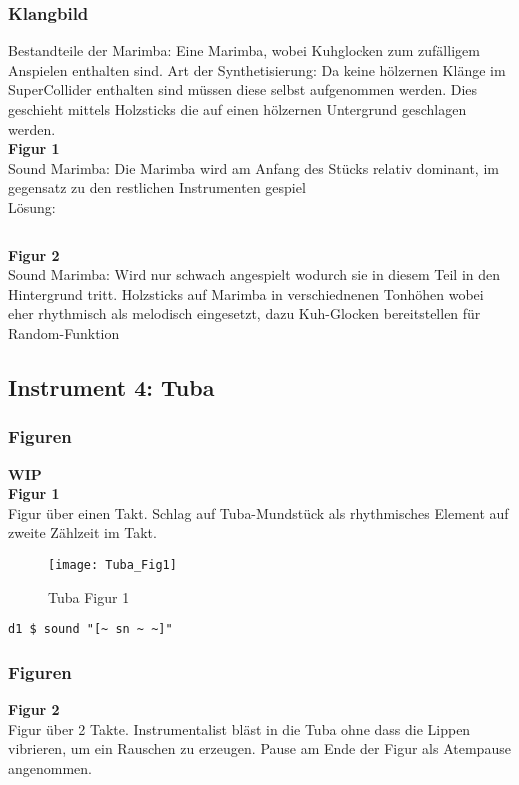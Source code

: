 \documentclass[
10pt, %
a4paper, %
oneside, %
headinclude,footinclude, %
BCOR5mm, %
]{scrartcl}
\begin{document}
\subsubsection{Klangbild}
Bestandteile der Marimba: Eine Marimba, wobei Kuhglocken zum zufälligem Anspielen enthalten sind.
Art der Synthetisierung: Da keine hölzernen Klänge im SuperCollider enthalten sind müssen diese selbst aufgenommen werden. Dies geschieht mittels 
Holzsticks die auf einen hölzernen Untergrund geschlagen werden.\\
\noindent \textbf{Figur 1}\\
Sound Marimba: Die Marimba wird am Anfang des Stücks relativ dominant, im gegensatz zu den restlichen Instrumenten gespiel\\
Lösung:\\
\begin{lstlisting}

\end{lstlisting}
\noindent \textbf{Figur 2}\\
Sound Marimba: Wird nur schwach angespielt wodurch sie in diesem Teil in den Hintergrund tritt.
Holzsticks auf Marimba in verschiednenen Tonhöhen wobei eher rhythmisch als melodisch eingesetzt, dazu Kuh-Glocken bereitstellen für Random-Funktion

\subsection{Instrument 4: Tuba}
\subsubsection{Figuren}
{\color{orange}\textbf{WIP}} \\

\noindent\textbf{Figur 1}\\
Figur über einen Takt. Schlag auf Tuba-Mundstück als rhythmisches Element auf zweite Zählzeit im Takt.\\
\begin{figure}[h]
	\centering 
	\texttt{[image: Tuba\_Fig1]} 
	\caption{Tuba Figur 1}
\end{figure}

\begin{lstlisting}
d1 $ sound "[~ sn ~ ~]"
\end{lstlisting}

\subsubsection{Figuren}
\textbf{Figur 2}\\
Figur über 2 Takte. Instrumentalist bläst in die Tuba ohne dass die Lippen vibrieren, um ein Rauschen zu erzeugen. Pause am Ende der Figur als Atempause angenommen. 
\end{document}
